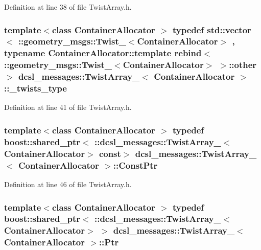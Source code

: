 \-Definition at line 38 of file \-Twist\-Array.\-h.

\subsubsection[{\-\_\-twists\-\_\-type}]{\setlength{\rightskip}{0pt plus 5cm}template$<$class Container\-Allocator $>$ typedef std\-::vector$<$ \-::geometry\-\_\-msgs\-::\-Twist\-\_\-$<$\-Container\-Allocator$>$ , typename \-Container\-Allocator\-::template rebind$<$ \-::geometry\-\_\-msgs\-::\-Twist\-\_\-$<$\-Container\-Allocator$>$ $>$\-::other $>$ {\bf dcsl\-\_\-messages\-::\-Twist\-Array\-\_\-}$<$ \-Container\-Allocator $>$\-::{\bf \-\_\-twists\-\_\-type}}\label{structdcsl__messages_1_1TwistArray___ad9e1fe2c91ddfe126b55a86e64a9f2ce}


\-Definition at line 41 of file \-Twist\-Array.\-h.

\subsubsection[{\-Const\-Ptr}]{\setlength{\rightskip}{0pt plus 5cm}template$<$class Container\-Allocator $>$ typedef boost\-::shared\-\_\-ptr$<$ \-::{\bf dcsl\-\_\-messages\-::\-Twist\-Array\-\_\-}$<$\-Container\-Allocator$>$ const$>$ {\bf dcsl\-\_\-messages\-::\-Twist\-Array\-\_\-}$<$ \-Container\-Allocator $>$\-::{\bf \-Const\-Ptr}}\label{structdcsl__messages_1_1TwistArray___a94274542b267433bd09d971ad1d4d9f9}


\-Definition at line 46 of file \-Twist\-Array.\-h.

\subsubsection[{\-Ptr}]{\setlength{\rightskip}{0pt plus 5cm}template$<$class Container\-Allocator $>$ typedef boost\-::shared\-\_\-ptr$<$ \-::{\bf dcsl\-\_\-messages\-::\-Twist\-Array\-\_\-}$<$\-Container\-Allocator$>$ $>$ {\bf dcsl\-\_\-messages\-::\-Twist\-Array\-\_\-}$<$ \-Container\-Allocator $>$\-::{\bf \-Ptr}}\label{structdcsl__messages_1_1TwistArray___a227ffae86446fdb222880300dd4e8ece}


